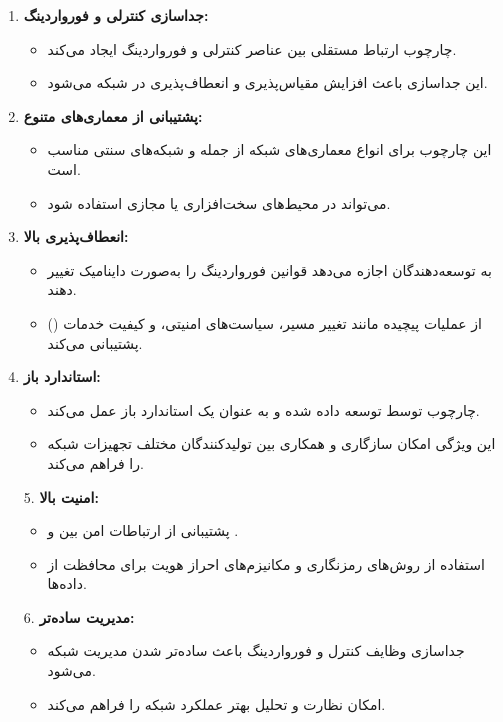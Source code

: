 \begin{qsolve}
	\begin{enumerate}
		\item \textbf{جداسازی کنترلی و فورواردینگ:}
		\begin{itemize}
			\item چارچوب  ارتباط مستقلی بین عناصر کنترلی و فورواردینگ ایجاد می‌کند.
			\item این جداسازی باعث افزایش مقیاس‌پذیری و انعطاف‌پذیری در شبکه می‌شود.
		\end{itemize}
		
		\item \textbf{پشتیبانی از معماری‌های متنوع:}
		\begin{itemize}
			\item این چارچوب برای انواع معماری‌های شبکه از جمله  و شبکه‌های سنتی مناسب است.
			\item می‌تواند در محیط‌های سخت‌افزاری یا مجازی استفاده شود.
		\end{itemize}
		
		\item \textbf{انعطاف‌پذیری بالا:}
		\begin{itemize}
			\item به توسعه‌دهندگان اجازه می‌دهد قوانین فورواردینگ را به‌صورت داینامیک تغییر دهند.
			\item از عملیات پیچیده مانند تغییر مسیر، سیاست‌های امنیتی، و کیفیت خدمات () پشتیبانی می‌کند.
		\end{itemize}
		
		\item \textbf{استاندارد باز:}
		\begin{itemize}
			\item چارچوب  توسط  توسعه داده شده و به عنوان یک استاندارد باز عمل می‌کند.
			\item این ویژگی امکان سازگاری و همکاری بین تولیدکنندگان مختلف تجهیزات شبکه را فراهم می‌کند.
		\end{itemize}
	\end{enumerate}
\end{qsolve}
\newpage

\begin{qsolve}
	\begin{enumerate}
		\item [5.] \textbf{امنیت بالا:}
		\begin{itemize}
			\item پشتیبانی از ارتباطات امن بین  و .
			\item استفاده از روش‌های رمزنگاری و مکانیزم‌های احراز هویت برای محافظت از داده‌ها.
		\end{itemize}
		
		\item [6.] \textbf{مدیریت ساده‌تر:}
		\begin{itemize}
			\item جداسازی وظایف کنترل و فورواردینگ باعث ساده‌تر شدن مدیریت شبکه می‌شود.
			\item امکان نظارت و تحلیل بهتر عملکرد شبکه را فراهم می‌کند.
		\end{itemize}
	\end{enumerate}
\end{qsolve}